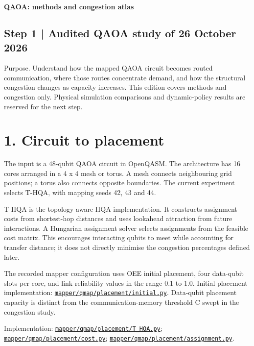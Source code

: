 \documentclass[10pt,a4paper]{article}
\begin{document}
{\LARGE\bfseries QAOA: methods and congestion atlas\par}
\subsection*{Step 1 | Audited QAOA study of 26 October 2026}
Purpose. Understand how the mapped QAOA circuit becomes routed communication, where those routes concentrate demand, and how the structural congestion changes as capacity increases. This edition covers methods and congestion only. Physical simulation comparisons and dynamic-policy results are reserved for the next step.\par
\section*{1. Circuit to placement}
The input is a 48-qubit QAOA circuit in OpenQASM. The architecture has 16 cores arranged in a 4 x 4 mesh or torus. A mesh connects neighbouring grid positions; a torus also connects opposite boundaries. The current experiment selects T-HQA, with mapping seeds 42, 43 and 44.\par
T-HQA is the topology-aware HQA implementation. It constructs assignment costs from shortest-hop distances and uses lookahead attraction from future interactions. A Hungarian assignment solver selects assignments from the feasible cost matrix. This encourages interacting qubits to meet while accounting for transfer distance; it does not directly minimise the congestion percentages defined later.\par
The recorded mapper configuration uses OEE initial placement, four data-qubit slots per core, and link-reliability values in the range 0.1 to 1.0. Initial-placement implementation: \href{\detokenize{file:///home/dhruv-pansuriya/Documents/BTP/Compiler-Driven-ACE/mapper/qmap/placement/initial.py}}{\nolinkurl{mapper/qmap/placement/initial.py}}. Data-qubit placement capacity is distinct from the communication-memory threshold C swept in the congestion study.\par
Implementation: \href{\detokenize{file:///home/dhruv-pansuriya/Documents/BTP/Compiler-Driven-ACE/mapper/qmap/placement/T_HQA.py}}{\nolinkurl{mapper/qmap/placement/T_HQA.py}}; \href{\detokenize{file:///home/dhruv-pansuriya/Documents/BTP/Compiler-Driven-ACE/mapper/qmap/placement/cost.py}}{\nolinkurl{mapper/qmap/placement/cost.py}}; \href{\detokenize{file:///home/dhruv-pansuriya/Documents/BTP/Compiler-Driven-ACE/mapper/qmap/placement/assignment.py}}{\nolinkurl{mapper/qmap/placement/assignment.py}}.\par
\end{document}
